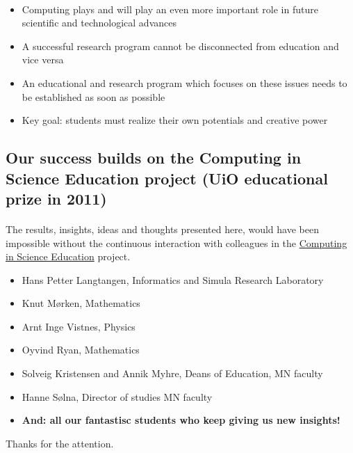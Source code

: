 \documentclass[%
oneside,                 %
final,                   %
10pt]{article}
\begin{document}
\paragraph{}
\begin{itemize}
\item Computing plays and will play an even more important role in future scientific and technological advances

\item A successful research program cannot be disconnected from education and vice versa

\item An educational and research program which focuses on these issues needs to be established as soon as possible

\item Key goal: students must realize their own potentials and creative power
\end{itemize}

\noindent




\subsection{Our success builds on the Computing in Science Education project (UiO educational prize in 2011)}


\paragraph{}
The results, insights, ideas and thoughts presented here, would have been impossible without the continuous interaction with colleagues in the \href{{http://www.mn.uio.no/english/about/collaboration/cse/}}{Computing in Science Education} project.

\begin{itemize}
\item Hans Petter Langtangen, Informatics and Simula Research Laboratory

\item Knut Mørken, Mathematics

\item Arnt Inge Vistnes, Physics

\item Oyvind Ryan, Mathematics

\item Solveig Kristensen and Annik Myhre, Deans of Education, MN faculty

\item Hanne Sølna, Director of studies MN faculty

\item \textbf{And: all our fantastisc students who keep giving us new insights!}
\end{itemize}

\noindent


Thanks for the attention.










\printindex
\end{document}
